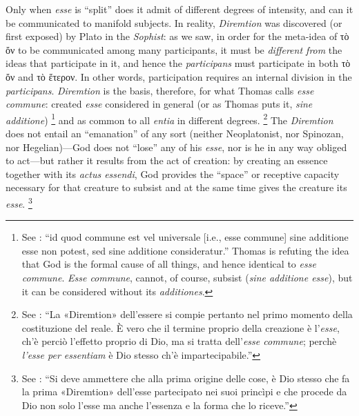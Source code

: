 Only when \emph{esse} is “split” does it admit of different degrees of intensity, and can it be communicated to manifold subjects. In reality, \emph{Diremtion} was discovered (or first exposed) by Plato in the \emph{Sophist}: as we saw, in order for the meta-idea of τὸ ὄν to be communicated among many participants, it must be \emph{different from} the ideas that participate in it, and hence the \emph{participans} must participate in both τὸ ὄν and τὸ ἕτερον. In other words, participation requires an internal division in the \emph{participans}. \emph{Diremtion} is the basis, therefore, for what Thomas calls \emph{esse commune}: created \emph{esse} considered in general (or as Thomas puts it, \emph{sine additione})%
%
\footnote{See \cite[I, cap.~26, n.~11 (Marietti n.~247)]{st:contragent}: “id quod commune est vel universale [i.e., esse commune] sine additione esse non potest, sed sine additione consideratur.” Thomas is refuting the idea that God is the formal cause of all things, and hence identical to \emph{esse commune}. \emph{Esse commune}, cannot, of course, subsist (\emph{sine additione esse}), but it can be considered without its \emph{additiones}.} and as common to all \emph{entia} in different degrees.%
%
\footnote{See \cite[379]{fabro:partecipazione}: “La «Diremtion» dell’essere si compie pertanto nel primo momento della costituzione del reale. È vero che il termine proprio della creazione è l’\emph{esse}, ch’è perciò l’effetto proprio di Dio, ma si tratta dell’\emph{esse commune}; perchè \emph{l’esse per essentiam} è Dio stesso ch’è impartecipabile.”} The \emph{Diremtion} does not entail an “emanation” of any sort (neither Neoplatonist, nor Spinozan, nor Hegelian)—God does not “lose” any of his \emph{esse}, nor is he in any way obliged to act—but rather it results from the act of creation: by creating an essence together with its \emph{actus essendi}, God provides the “space” or receptive capacity necessary for that creature to subsist and at the same time gives the creature its \emph{esse}.%
%
\footnote{See \cite[366]{fabro:partecipazione}: “Si deve ammettere che alla prima origine delle cose, è Dio stesso che fa la prima «Diremtion» dell’esse partecipato nei suoi princìpi e che procede da Dio non solo l’esse ma anche l’essenza e la forma che lo riceve.”} 
%


